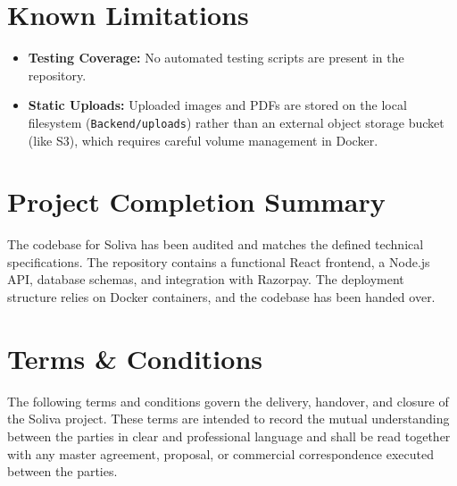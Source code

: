 \documentclass[11pt,a4paper]{article}
\newcommand{\ProjectName}{Soliva}
\begin{document}
\section{Known Limitations}
\begin{itemize}[leftmargin=*]
    \item \textbf{Testing Coverage:} No automated testing scripts are present
          in the repository.
    \item \textbf{Static Uploads:} Uploaded images and PDFs are stored on the
          local filesystem (\texttt{Backend/uploads}) rather than an external
          object storage bucket (like S3), which requires careful volume
          management in Docker.
\end{itemize}

\section{Project Completion Summary}
The codebase for Soliva has been audited and matches the defined technical
specifications. The repository contains a functional React frontend, a
Node.js API, database schemas, and integration with Razorpay. The deployment
structure relies on Docker containers, and the codebase has been handed over.

\newpage
\section{Terms \& Conditions}

The following terms and conditions govern the delivery, handover, and closure
of the \ProjectName{} project. These terms are intended to record the mutual
understanding between the parties in clear and professional language and
shall be read together with any master agreement, proposal, or commercial
correspondence executed between the parties.
\end{document}
